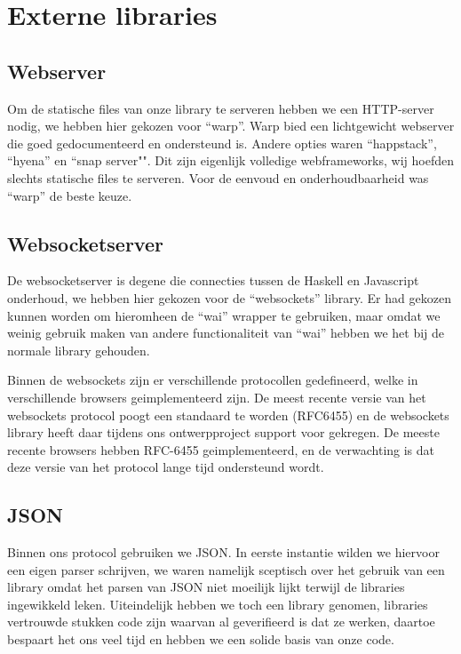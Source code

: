 \section{Externe libraries}

\subsection{Webserver}
Om de statische files van onze library te serveren hebben we een HTTP-server nodig, we hebben hier gekozen voor ``warp''. Warp bied een lichtgewicht webserver die goed gedocumenteerd en ondersteund is. Andere opties waren ``happstack'', ``hyena'' en ``snap server"". Dit zijn eigenlijk volledige webframeworks, wij hoefden slechts statische files te serveren. Voor de eenvoud en onderhoudbaarheid was ``warp'' de beste keuze.

\subsection{Websocketserver}
De websocketserver is degene die connecties tussen de Haskell en Javascript onderhoud, we hebben hier gekozen voor de ``websockets'' library. Er had gekozen kunnen worden om hieromheen de ``wai'' wrapper te gebruiken, maar omdat we weinig gebruik maken van andere functionaliteit van ``wai'' hebben we het bij de normale library gehouden.

Binnen de websockets zijn er verschillende protocollen gedefineerd, welke in verschillende browsers geimplementeerd zijn. De meest recente versie van het websockets protocol poogt een standaard te worden (RFC6455) en de websockets library heeft daar tijdens ons ontwerpproject support voor gekregen. De meeste recente browsers hebben RFC-6455 geimplementeerd, en de verwachting is dat deze versie van het protocol lange tijd ondersteund wordt.

\subsection{JSON}
Binnen ons protocol gebruiken we JSON. In eerste instantie wilden we hiervoor een eigen parser schrijven, we waren namelijk sceptisch over het gebruik van een library omdat het parsen van JSON niet moeilijk lijkt terwijl de libraries ingewikkeld leken. Uiteindelijk hebben we toch een library genomen, libraries vertrouwde stukken code zijn waarvan al geverifieerd is dat ze werken, daartoe bespaart het ons veel tijd en hebben we een solide basis van onze code.

